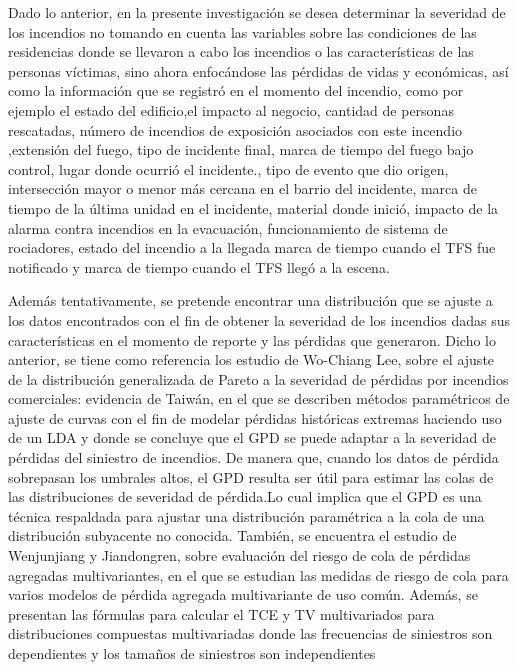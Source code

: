 \documentclass[
  oneside]{memoir}
\begin{document}
Dado lo anterior, en la presente investigación se desea determinar la
severidad de los incendios no tomando en cuenta las variables sobre las
condiciones de las residencias donde se llevaron a cabo los incendios o
las características de las personas víctimas, sino ahora enfocándose las
pérdidas de vidas y económicas, así como la información que se registró
en el momento del incendio, como por ejemplo el estado del edificio,el
impacto al negocio, cantidad de personas rescatadas, número de incendios
de exposición asociados con este incendio ,extensión del fuego, tipo de
incidente final, marca de tiempo del fuego bajo control, lugar donde
ocurrió el incidente., tipo de evento que dio origen, intersección mayor
o menor más cercana en el barrio del incidente, marca de tiempo de la
última unidad en el incidente, material donde inició, impacto de la
alarma contra incendios en la evacuación, funcionamiento de sistema de
rociadores, estado del incendio a la llegada marca de tiempo cuando el
TFS fue notificado y marca de tiempo cuando el TFS llegó a la escena.

Además tentativamente, se pretende encontrar una distribución que se
ajuste a los datos encontrados con el fin de obtener la severidad de los
incendios dadas sus características en el momento de reporte y las
pérdidas que generaron. Dicho lo anterior, se tiene como referencia los
estudio de Wo-Chiang Lee, sobre el ajuste de la distribución
generalizada de Pareto a la severidad de pérdidas por incendios
comerciales: evidencia de Taiwán, en el que se describen métodos
paramétricos de ajuste de curvas con el fin de modelar pérdidas
históricas extremas haciendo uso de un LDA y donde se concluye que el
GPD se puede adaptar a la severidad de pérdidas del siniestro de
incendios. De manera que, cuando los datos de pérdida sobrepasan los
umbrales altos, el GPD resulta ser útil para estimar las colas de las
distribuciones de severidad de pérdida.Lo cual implica que el GPD es una
técnica respaldada para ajustar una distribución paramétrica a la cola
de una distribución subyacente no conocida. También, se encuentra el
estudio de Wenjunjiang y Jiandongren, sobre evaluación del riesgo de
cola de pérdidas agregadas multivariantes, en el que se estudian las
medidas de riesgo de cola para varios modelos de pérdida agregada
multivariante de uso común. Además, se presentan las fórmulas para
calcular el TCE y TV multivariados para distribuciones compuestas
multivariadas donde las frecuencias de siniestros son dependientes y los
tamaños de siniestros son independientes

\printbibliography

\backmatter
\end{document}
